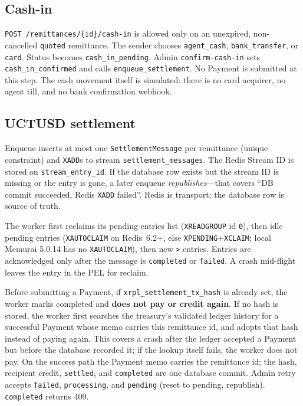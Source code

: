 \documentclass[11pt]{article}
\begin{document}
\subsection{Cash-in}
\texttt{POST /remittances/\{id\}/cash-in} is allowed only on an unexpired, non-cancelled \texttt{quoted} remittance. The sender chooses \texttt{agent\_cash}, \texttt{bank\_transfer}, or \texttt{card}. Status becomes \texttt{cash\_in\_pending}. Admin \texttt{confirm-cash-in} sets \texttt{cash\_in\_confirmed} and calls \texttt{enqueue\_settlement}. No Payment is submitted at this step. The cash movement itself is simulated: there is no card acquirer, no agent till, and no bank confirmation webhook.

\subsection{UCTUSD settlement}
Enqueue inserts at most one \texttt{SettlementMessage} per remittance (unique constraint) and \texttt{XADD}s to stream \texttt{settlement\_messages}. The Redis Stream ID is stored on \texttt{stream\_entry\_id}. If the database row exists but the stream ID is missing or the entry is gone, a later enqueue \emph{republishes}---that covers ``DB commit succeeded, Redis \texttt{XADD} failed''. Redis is transport; the database row is source of truth.

The worker first reclaims its pending-entries list (\texttt{XREADGROUP} id \texttt{0}), then idle pending entries (\texttt{XAUTOCLAIM} on Redis~6.2+, else \texttt{XPENDING}+\texttt{XCLAIM}; local Memurai 5.0.14 has no \texttt{XAUTOCLAIM}), then new \texttt{>} entries. Entries are acknowledged only after the message is \texttt{completed} or \texttt{failed}. A crash mid-flight leaves the entry in the PEL for reclaim.

Before submitting a Payment, if \texttt{xrpl\_settlement\_tx\_hash} is already set, the worker marks completed and \textbf{does not pay or credit again}. If no hash is stored, the worker first searches the treasury's validated ledger history for a successful Payment whose memo carries this remittance id, and adopts that hash instead of paying again. This covers a crash after the ledger accepted a Payment but before the database recorded it; if the lookup itself fails, the worker does not pay. On the success path the Payment memo carries the remittance id; the hash, recipient credit, \texttt{settled}, and \texttt{completed} are one database commit. Admin retry accepts \texttt{failed}, \texttt{processing}, and \texttt{pending} (reset to pending, republish). \texttt{completed} returns 409.
\end{document}
